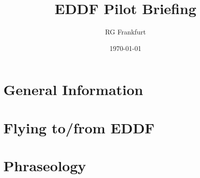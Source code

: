 \documentclass[10pt,a4paper]{article}
\begin{document}
\begin{titlepage}
\title{EDDF Pilot Briefing}
\author{RG Frankfurt}
\date{\today}
\maketitle
\end{titlepage}

\section{General Information}


\section{Flying to/from EDDF}


\section{Phraseology}

\end{document}
